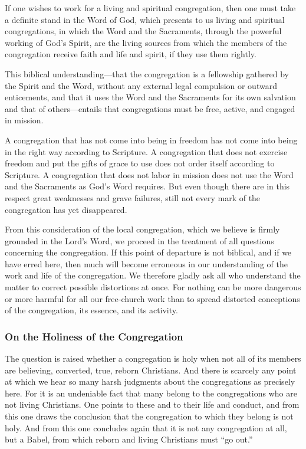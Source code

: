 If one wishes to work for a living and spiritual congregation, then one must take a definite stand in the Word of God, which presents to us living and spiritual congregations, in which the Word and the Sacraments, through the powerful working of God’s Spirit, are the living sources from which the members of the congregation receive faith and life and spirit, if they use them rightly.

This biblical understanding—that the congregation is a fellowship gathered by the Spirit and the Word, without any external legal compulsion or outward enticements, and that it uses the Word and the Sacraments for its own salvation and that of others—entails that congregations must be free, active, and engaged in mission.

A congregation that has not come into being in freedom has not come into being in the right way according to Scripture. A congregation that does not exercise freedom and put the gifts of grace to use does not order itself according to Scripture. A congregation that does not labor in mission does not use the Word and the Sacraments as God’s Word requires. But even though there are in this respect great weaknesses and grave failures, still not every mark of the congregation has yet disappeared.

From this consideration of the local congregation, which we believe is firmly grounded in the Lord’s Word, we proceed in the treatment of all questions concerning the congregation. If this point of departure is not biblical, and if we have erred here, then much will become erroneous in our understanding of the work and life of the congregation. We therefore gladly ask all who understand the matter to correct possible distortions at once. For nothing can be more dangerous or more harmful for all our free-church work than to spread distorted conceptions of the congregation, its essence, and its activity.

\subsubsection{On the Holiness of the Congregation}

The question is raised whether a congregation is holy when not all of its members are believing, converted, true, reborn Christians. And there is scarcely any point at which we hear so many harsh judgments about the congregations as precisely here. For it is an undeniable fact that many belong to the congregations who are not living Christians. One points to these and to their life and conduct, and from this one draws the conclusion that the congregation to which they belong is not holy. And from this one concludes again that it is not any congregation at all, but a Babel, from which reborn and living Christians must “go out.”

